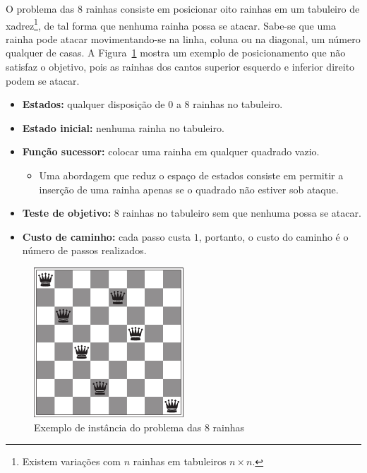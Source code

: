 O problema das 8 rainhas consiste em posicionar oito rainhas em um tabuleiro de xadrez\footnote{Existem variações com $n$ rainhas em tabuleiros $n \times n$.}, de tal forma que nenhuma rainha possa se atacar. Sabe-se que uma rainha pode atacar movimentando-se na linha, coluna ou na diagonal, um número qualquer de casas. A Figura~\ref{fig:exemplo-problema-8-rainhas} mostra um exemplo de posicionamento que não satisfaz o objetivo, pois as rainhas dos cantos superior esquerdo e inferior direito podem se atacar.

\begin{itemize}
	\item \textbf{Estados:} qualquer disposição de $0$ a $8$ rainhas no tabuleiro.
	
	\item \textbf{Estado inicial:} nenhuma rainha no tabuleiro.
	
	\item \textbf{Função sucessor:} colocar uma rainha em qualquer quadrado vazio.
	\begin{itemize}
		\item Uma abordagem que reduz o espaço de estados consiste em permitir a inserção de uma rainha apenas se o quadrado não estiver sob ataque.
	\end{itemize}
	
	\item \textbf{Teste de objetivo:} $8$ rainhas no tabuleiro sem que nenhuma possa se atacar.
	
	\item \textbf{Custo de caminho:} cada passo custa $1$, portanto, o custo do caminho é o número de passos realizados.
\end{itemize}

\begin{figure}[h]
	\centering
	\includegraphics[width=0.5\textwidth]{img/exemplo-problema-8-rainhas}
	\caption{Exemplo de instância do problema das 8 rainhas}
	\label{fig:exemplo-problema-8-rainhas}
\end{figure}

